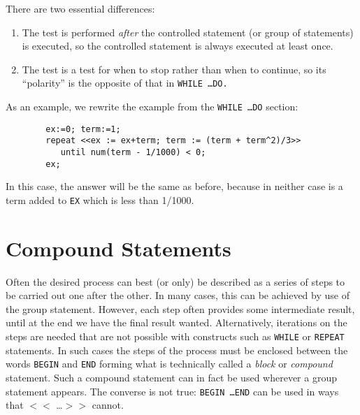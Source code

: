 There are two essential differences:
\begin{enumerate}
\item The test is performed {\em after\/} the controlled statement (or group of
statements) is executed, so the controlled statement is always executed at
least once.

\item The test is a test for when to stop rather than when to continue, so its
``polarity'' is the opposite of that in {\tt WHILE \ldots DO.}
\end{enumerate}

As an example, we rewrite the example from the {\tt WHILE \ldots DO} section:
\begin{samepage}
\begin{verbatim}
        ex:=0; term:=1;
        repeat <<ex := ex+term; term := (term + term^2)/3>>
           until num(term - 1/1000) < 0;
        ex;
\end{verbatim}
\end{samepage}
In this case, the answer will be the same as before, because in neither
case is a term added to {\tt EX} which is less than 1/1000.

\section{Compound Statements}

Often the desired process can best (or only) be
described as a series of steps to be carried out one after the other.  In
many cases, this can be achieved by use of the group statement.  However, each step often provides some intermediate
result, until at the end we have the final result wanted.  Alternatively,
iterations on the steps are needed that are not possible with constructs
such as {\tt WHILE} or {\tt REPEAT}
statements.  In such cases the steps of the process must be
enclosed between the words {\tt BEGIN} and {\tt END} forming what is technically called a {\em block\/} or
{\em compound\/} statement.  Such a compound statement can in fact be used
wherever a group statement appears.  The converse is not true: {\tt BEGIN
\ldots END} can be used in ways that {\tt $<<$} \ldots {\tt $>>$} cannot.

